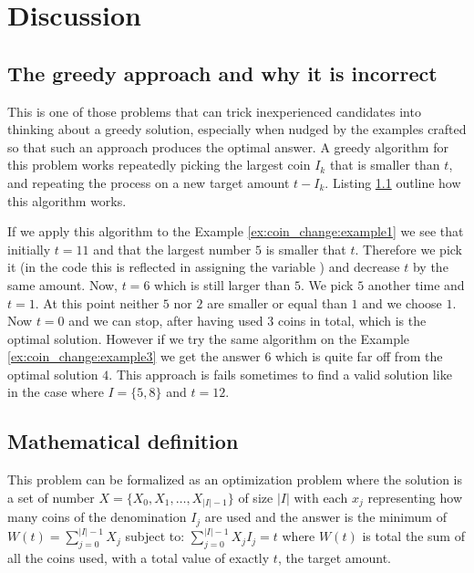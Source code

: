 \section{Discussion}
\label{coin_change:sec:discussion}

\subsection{The greedy approach and why it is incorrect}
This is one of those problems that can trick inexperienced candidates into thinking about a greedy solution, especially when nudged by the examples crafted so that such an approach produces the optimal answer. A greedy algorithm for this problem works repeatedly picking the largest coin $I_k$ that is smaller than $t$, and repeating the process on a new target amount $t-I_k$.
Listing \ref{} outline how this algorithm works.

If we apply this algorithm to the Example \ref{ex:coin_change:example1}  we see that initially $t=11$
and that the largest number $5$ is smaller that $t$. Therefore we pick it (in the code this is reflected in assigning the variable ) and decrease $t$ by the same amount. Now, $t=6$ which is still larger than $5$. We pick $5$ another time and $t = 1$.
At this point neither $5$ nor $2$ are smaller or equal than $1$ and we choose $1$. Now $t=0$ and we can stop, after having used $3$ coins in total, which is the optimal solution.
However if we try the same algorithm on the Example \ref{ex:coin_change:example3} we get the answer $6$ which is quite far off from the optimal solution $4$. This approach is fails sometimes to find a valid solution like in the case where $I=\{5,8\}$ and $t=12$.





\subsection{Mathematical definition}
\label{coin_change:sec:mathdefinition}
This problem can be formalized as an optimization problem where the solution is a set of number $X=\{X_0,X_1,\ldots, X_{|I|-1}\}$ of size $|I|$ with each $x_j$ representing how many coins of the denomination $I_j$ are used and the answer is the minimum of 
$
	W(t) = \sum_{j=0}^{|I|-1} X_j
$
subject to:
$
	\sum_{j=0}^{|I|-1} X_j I_j = t
$
where $W(t)$ is total the sum of all the coins used, with a total value of exactly $t$, the target amount.

